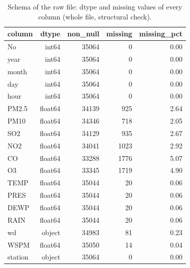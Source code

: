 \begin{table}[t]
\centering
\small
\caption{Schema of the raw file: dtype and missing values of every column (whole file, structural check).}
\label{tab:table_S01_schema_and_missing_values}
\begin{tabular}{lrrrr}
\toprule
column & dtype & non\_null & missing & missing\_pct \\
\midrule
No & int64 & 35064 & 0 & 0.00 \\
year & int64 & 35064 & 0 & 0.00 \\
month & int64 & 35064 & 0 & 0.00 \\
day & int64 & 35064 & 0 & 0.00 \\
hour & int64 & 35064 & 0 & 0.00 \\
PM2.5 & float64 & 34139 & 925 & 2.64 \\
PM10 & float64 & 34346 & 718 & 2.05 \\
SO2 & float64 & 34129 & 935 & 2.67 \\
NO2 & float64 & 34041 & 1023 & 2.92 \\
CO & float64 & 33288 & 1776 & 5.07 \\
O3 & float64 & 33345 & 1719 & 4.90 \\
TEMP & float64 & 35044 & 20 & 0.06 \\
PRES & float64 & 35044 & 20 & 0.06 \\
DEWP & float64 & 35044 & 20 & 0.06 \\
RAIN & float64 & 35044 & 20 & 0.06 \\
wd & object & 34983 & 81 & 0.23 \\
WSPM & float64 & 35050 & 14 & 0.04 \\
station & object & 35064 & 0 & 0.00 \\
\bottomrule
\end{tabular}
\end{table}

